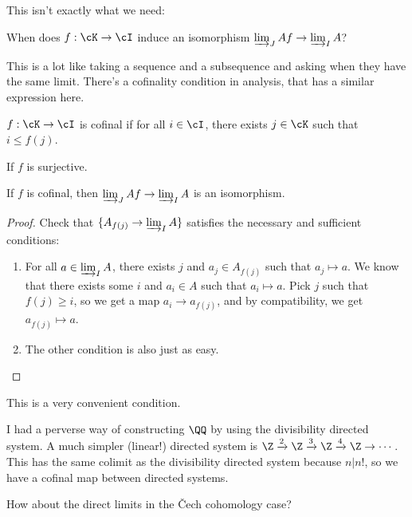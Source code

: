 This isn't exactly what we need:
\begin{question}
When does $f:\cK\to\cI$ induce an isomorphism $\varinjlim_{J}Af\to\varinjlim_{I}A$?
\end{question}
This is a lot like taking a sequence and a subsequence and asking when they have the same limit. There's a cofinality condition in analysis, that has a similar expression here.
\begin{definition}
$f:\cK\to\cI$ is cofinal if for all $i\in\cI$, there exists $j\in\cK$ such that $i\leq f(j)$.
\end{definition}
\begin{example}
If $f$ is surjective.
\end{example}
\begin{lemma}
If $f$ is cofinal, then $\varinjlim_{J}Af\to\varinjlim_{I}A$ is an isomorphism.
\end{lemma}
\begin{proof}
Check that $\{A_{f(j)}\to\varinjlim_{I}A\}$ satisfies the necessary and sufficient conditions:
\begin{enumerate}
\item For all $a\in\varinjlim_{I}A$, there exists $j$ and $a_j\in A_{f(j)}$ such that $a_j\mapsto a$. We know that there exists some $i$ and $a_i\in A$ such that $a_i\mapsto a$. Pick $j$ such that $f(j)\geq i$, so we get a map $a_i\to a_{f(j)}$, and by compatibility, we get $a_{f(j)}\mapsto a$.
\item The other condition is also just as easy.
\end{enumerate}
\end{proof}
This is a very convenient condition.
\begin{example}
I had a perverse way of constructing $\QQ$ by using the divisibility directed system. A much simpler (linear!) directed system is $\Z\xrightarrow{2}\Z\xrightarrow{3}\Z\xrightarrow{4}\Z\to\cdots$. This has the same colimit as the divisibility directed system because $n|n!$, so we have a cofinal map between directed systems.
\end{example}
How about the direct limits in the \v{C}ech cohomology case?
